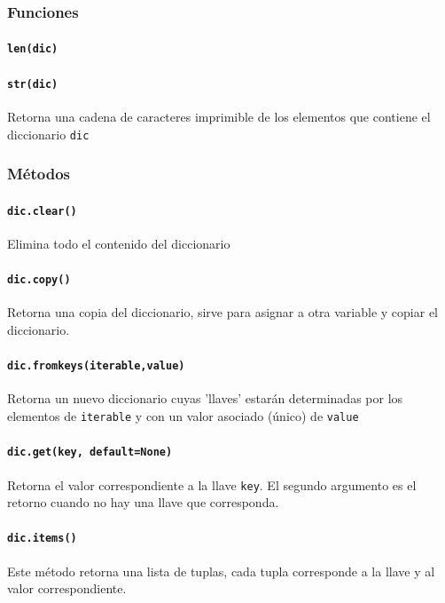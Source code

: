 \subsubsection{Funciones}

\paragraph{\texttt{len(dic)}}

\paragraph{\texttt{str(dic)}} Retorna una cadena de caracteres imprimible de los elementos que contiene el diccionario \texttt{dic}


\subsubsection{Métodos}

\paragraph{\texttt{dic.clear()}} Elimina todo el contenido del diccionario

\paragraph{\texttt{dic.copy()}} Retorna una copia del diccionario, sirve para asignar a otra variable y copiar el diccionario.

\paragraph{\texttt{dic.fromkeys(iterable,value)}} Retorna un nuevo diccionario cuyas 'llaves' estarán determinadas por los elementos de \texttt{iterable} y con un valor asociado (único) de \texttt{value}

\paragraph{\texttt{dic.get(key, default=None)}} Retorna el valor correspondiente a la llave \texttt{key}. El segundo argumento es el retorno cuando no hay una llave que corresponda.

\paragraph{\texttt{dic.items()}} Este método retorna una lista de tuplas, cada tupla corresponde a la llave y al valor correspondiente.

